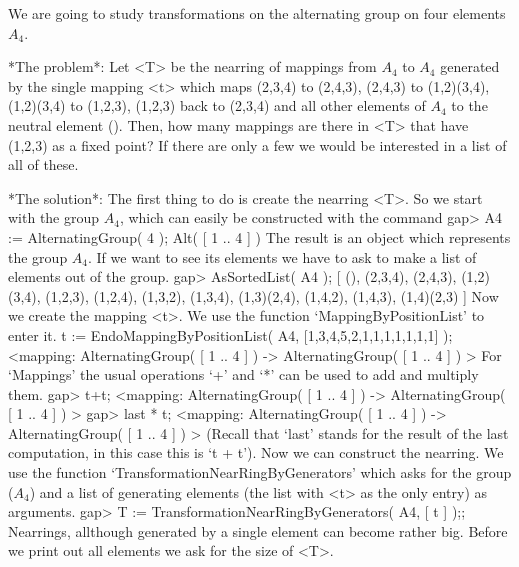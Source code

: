 %
%

We are going to study transformations on the alternating group on four elements
$A_4$.

*The problem*: Let <T> be the nearring of mappings from $A_4$ to $A_4$
        generated by the single mapping <t> which maps (2,3,4) to (2,4,3),
        (2,4,3) to (1,2)(3,4), (1,2)(3,4) to (1,2,3), (1,2,3) back to (2,3,4)
        and all other elements of $A_4$ to the neutral element (). Then,
        how many mappings are there in <T> that have (1,2,3) as a fixed point?
        If there are only a few we would be interested in a list of all of
        these.
        
*The solution*: \hfill\break
        The first thing to do is create the nearring <T>. So we start with
        the group $A_4$, which can easily be constructed with the command
\beginexample
    gap> A4 := AlternatingGroup( 4 );
    Alt( [ 1 .. 4 ] )
\endexample
        The result is an object which represents the group $A_4$. If we want
        to see its elements we have to ask {\GAP} to make a list of elements
        out of the group.
\beginexample
    gap> AsSortedList( A4 );                                       
    [ (), (2,3,4), (2,4,3), (1,2)(3,4), (1,2,3), (1,2,4), (1,3,2),
     (1,3,4), (1,3)(2,4), (1,4,2), (1,4,3), (1,4)(2,3) ]
\endexample
        Now we create the mapping <t>. We use the function
        `MappingByPositionList' to enter it.
\beginexample
    t := EndoMappingByPositionList( A4, [1,3,4,5,2,1,1,1,1,1,1,1] );
    <mapping: AlternatingGroup( [ 1 .. 4 ] ) -> AlternatingGroup( 
    [ 1 .. 4 ] ) >
\endexample
        For `Mappings' the usual operations `+' and
        `*' can be used to add and multiply them.
\beginexample
    gap> t+t;
    <mapping: AlternatingGroup( [ 1 .. 4 ] ) -> AlternatingGroup( 
    [ 1 .. 4 ] ) >
    gap> last * t;
    <mapping: AlternatingGroup( [ 1 .. 4 ] ) -> AlternatingGroup( 
    [ 1 .. 4 ] ) >
\endexample
        (Recall that `last' stands for the result of the last computation, in
        this case this is `t + t'). 
        Now we can construct the nearring. We use the function
        `TransformationNearRingByGenerators' which asks for the group ($A_4$)
        and a list of generating elements (the list with <t> as the only entry)
        as arguments.
\beginexample
    gap> T := TransformationNearRingByGenerators( A4, [ t ] );;
\endexample
        Nearrings, allthough generated by a single element can become rather
        big. Before we print out all elements we ask for the size of <T>.
